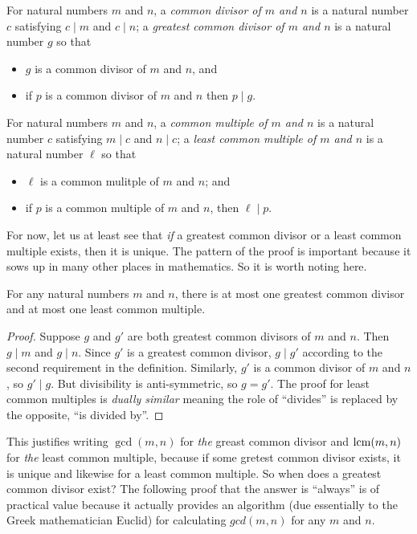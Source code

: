 \begin{defn}
  For natural numbers $m$ and $n$, a \emph{common divisor of $m$
    and $n$} is a natural number $c$ satisfying $c\mid m$ and $c\mid n$;
   a  \emph{greatest common divisor of $m$ and $n$} is a natural number $g$ so that
  \begin{itemize}
  \item $g$ is a common divisor of $m$ and $n$, and
  \item if $p$ is a common divisor of $m$ and $n$
    then $p\mid g$.
  \end{itemize}

  For natural numbers $m$ and $n$, a \emph{common multiple of $m$ and
    $n$} is a natural number $c$ satisfying $m\mid c$ and $n\mid c$;
    a \emph{least common multiple of $m$ and $n$} is a natural number $\ell$ so that
  \begin{itemize}
  \item $\ell$ is a common mulitple of $m$ and $n$; and
  \item if $p$ is a common multiple of $m$ and $n$,
    then $\ell\mid p$.
  \end{itemize}
\end{defn}

For now, let us at least see that \emph{if} a greatest common divisor or a least common multiple exists, then it is unique. The pattern of the proof is important because it sows up in many other places in mathematics. So it is worth noting here.

\begin{lemma}
  For any natural numbers $m$ and $n$, there is at most one greatest common divisor
and at most one least common multiple.

\begin{proof}
 Suppose $g$ and $g'$ are both greatest common divisors of $m$ and $n$. Then $g\mid m$ and $g\mid n$. Since $g'$ is a greatest common divisor, $g\mid g'$ according to the second requirement in the definition. Similarly, $g'$ is a common divisor of $m$ and $n$, so $g'\mid g$. But divisibility
is anti-symmetric, so $g=g'$. The proof for least common multiples is \emph{dually similar} meaning the role of ``divides'' is replaced by the opposite, ``is divided by''.
\end{proof}
\end{lemma}

This justifies writing $\gcd(m,n)$ for \emph{the} greast common divisor and $\operatorname{lcm}(m,n)$ for \emph{the} least common multiple, because if some gretest common divisor exists, it is unique and likewise for a least common multiple. So when does a greatest common divisor exist? The following proof that the answer is ``always'' is of practical value because it actually provides an algorithm (due essentially to the Greek mathematician Euclid) for calculating $gcd(m,n)$ for any $m$ and $n$.


